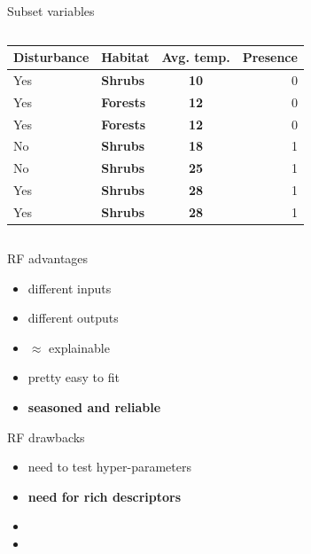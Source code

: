 \documentclass{irdbeamer}
\begin{document}
\begin{frame}{Subset variables}
\begin{columns}
    \begin{column}{0.5\textwidth}
\centering
{\footnotesize
\begin{tabular}{llc|r}
    \toprule
    Disturbance & \textbf{Habitat} & \textbf{Avg. temp.} & Presence \\
    \midrule
    Yes & \textbf{Shrubs }   & \textbf{10} & 0 \\
    Yes & \textbf{Forests}   & \textbf{12} & 0 \\
    Yes & \textbf{Forests}   & \textbf{12} & 0 \\
    No  & \textbf{Shrubs }   & \textbf{18} & 1 \\
    No  & \textbf{Shrubs }   & \textbf{25} & 1 \\
    Yes & \textbf{Shrubs }   & \textbf{28} & 1 \\
    Yes & \textbf{Shrubs }   & \textbf{28} & 1 \\
    \bottomrule
\end{tabular}
        }
    \end{column}
    \begin{column}{0.5\textwidth}
    \end{column}
\end{columns}
\end{frame}

\begin{frame}{RF advantages}
        \begin{itemize}
            \item<1-> different inputs
            \item<2-> different outputs
            \item<3-> $\approx$ explainable
            \item<4-> pretty easy to fit
            \item<5->[$\rightarrow$] \textbf{seasoned and reliable}
        \end{itemize}
\end{frame}

\begin{frame}{RF drawbacks}
        \begin{itemize}
            \item<1-> need to test hyper-parameters
            \item<2-> \textbf{need for rich descriptors}
            \item[] 
            \item[] 
        \end{itemize}
\end{frame}
\end{document}
